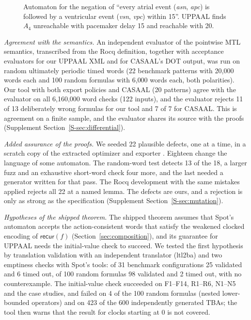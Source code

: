 \begin{figure}[t]
\centering
{}
\caption{Automaton for the negation of ``every atrial event (\textit{asn}, \textit{apc}) is followed by a ventricular event (\textit{vsn}, \textit{vpc}) within 15''. UPPAAL finds $A_4$ unreachable with pacemaker delay 15 and reachable with 20.}
\label{fig:pacemaker}
\end{figure}
\emph{Agreement with the semantics.} An independent evaluator of the pointwise MTL semantics, transcribed from the Rocq definition, together with acceptance evaluators for our UPPAAL XML and for CASAAL's DOT output, was run on random ultimately periodic timed words (22 benchmark patterns with 20{,}000 words each and 100 random formulas with 6{,}000 words each, both polarities). Our tool with both export policies and CASAAL (20 patterns) agree with the evaluator on all 6{,}160{,}000 word checks (122 inputs), and the evaluator rejects 11 of 13 deliberately wrong formulas for our tool and 7 of 7 for CASAAL. This is agreement on a finite sample, and the evaluator shares its source with the proofs (Supplement Section~\ref{S-sec:differential}).

\emph{Added assurance of the proofs.} We seeded 22 plausible defects, one at a time, in a scratch copy of the extracted optimizer and exporter . Eighteen change the language of some automaton. The random-word test detects 13 of the 18, a larger fuzz and an exhaustive short-word check four more, and the last needed a generator written for that pass. The Rocq development with the same mistakes applied rejects all 22 at a named lemma.  The defects are ours, and a rejection is only as strong as the specification (Supplement Section~\ref{S-sec:mutation}).

\emph{Hypotheses of the shipped theorem.} The shipped theorem assumes that Spot's automaton accepts the action-consistent words that satisfy the weakened clocked encoding of $\mathsf{recur}(f)$ (Section~\ref{sec:composition}), and its guarantee for UPPAAL needs the initial-value check to succeed. We tested the first hypothesis by translation validation with an independent translator (ltl2ba) and two emptiness checks with Spot's tools: of 31 benchmark configurations 25 validated and 6 timed out, of 100 random formulas 98 validated and 2 timed out, with no counterexample.   The initial-value check succeeded on F1--F14, R1--R6, N1--N5 and the case studies, and failed on 4 of the 100 random formulas (nested lower-bounded operators) and on 423 of the 600 independently generated TBAs; the tool then warns that the result for clocks starting at 0 is not covered.
